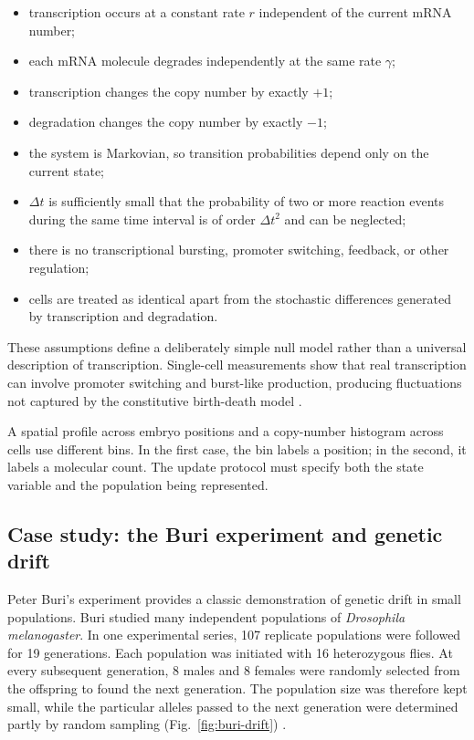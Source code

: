 \begin{itemize}
    \item transcription occurs at a constant rate $r$ independent of the current mRNA number;
    \item each mRNA molecule degrades independently at the same rate $\gamma$;
    \item transcription changes the copy number by exactly $+1$;
    \item degradation changes the copy number by exactly $-1$;
    \item the system is Markovian, so transition probabilities depend only on the current state;
    \item $\Delta t$ is sufficiently small that the probability of two or more reaction events during the same time interval is of order $\Delta t^2$ and can be neglected;
    \item there is no transcriptional bursting, promoter switching, feedback, or other regulation;
    \item cells are treated as identical apart from the stochastic differences generated by transcription and degradation.
\end{itemize}
These assumptions define a deliberately simple null model rather than a universal description of transcription.
Single-cell measurements show that real transcription can involve promoter switching and burst-like production, producing fluctuations not captured by the constitutive birth-death model \cite{golding2005real}.


A spatial profile across embryo positions and a copy-number histogram across cells use different bins.
In the first case, the bin labels a position; in the second, it labels a molecular count.
The update protocol must specify both the state variable and the population being represented.
\subsection{Case study: the Buri experiment and genetic drift}
\label{sec:buri}


Peter Buri's experiment provides a classic demonstration of genetic drift in small populations.
Buri studied many independent populations of \textit{Drosophila melanogaster}.
In one experimental series, 107 replicate populations were followed for 19 generations.
Each population was initiated with 16 heterozygous flies.
At every subsequent generation, 8 males and 8 females were randomly selected from the offspring to found the next generation.
The population size was therefore kept small, while the particular alleles passed to the next generation were determined partly by random sampling (Fig.~\ref{fig:buri-drift}) \cite{buri1956gene}.
%
% 
